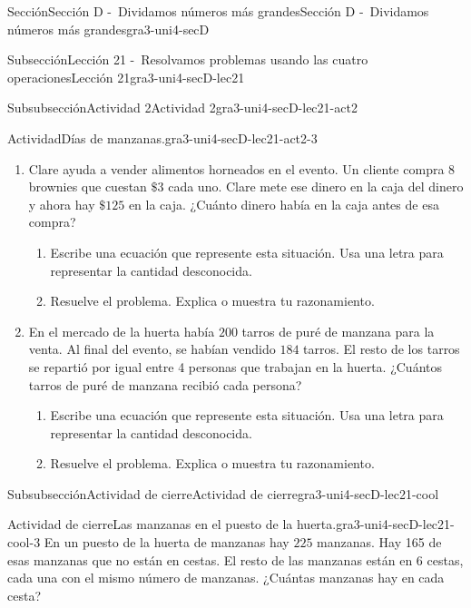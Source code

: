 \documentclass[twoside,10pt,]{article}
\begin{document}
\begin{sectionptx}{Sección}{Sección D -~Dividamos números más grandes}{}{Sección D -~Dividamos números más grandes}{}{}{gra3-uni4-secD}
\begin{subsectionptx}{Subsección}{Lección 21 -~Resolvamos problemas usando las cuatro operaciones}{}{Lección 21}{}{}{gra3-uni4-secD-lec21}
\begin{subsubsectionptx}{Subsubsección}{Actividad 2}{}{Actividad 2}{}{}{gra3-uni4-secD-lec21-act2}
\begin{activity}{Actividad}{Días de manzanas.}{gra3-uni4-secD-lec21-act2-3}
\begin{enumerate}
\begin{enumerate}
\item{}Escribe una ecuación que represente esta situación. Usa una letra para representar la cantidad desconocida.%
\item{}Resuelve el problema. Explica o muestra tu razonamiento.%
\end{enumerate}
\item{}Clare ayuda a vender alimentos horneados en el evento. Un cliente compra \(8\) brownies que cuestan \(\$3\) cada uno. Clare mete ese dinero en la caja del dinero y ahora hay \(\$125\) en la caja. ¿Cuánto dinero había en la caja antes de esa compra?%
%
\begin{enumerate}
\item{}Escribe una ecuación que represente esta situación. Usa una letra para representar la cantidad desconocida.%
\item{}Resuelve el problema. Explica o muestra tu razonamiento.%
\end{enumerate}
\item{}En el mercado de la huerta había \(200\) tarros de puré de manzana para la venta. Al final del evento, se habían vendido \(184\) tarros. El resto de los tarros se repartió por igual entre 4 personas que trabajan en la huerta. ¿Cuántos tarros de puré de manzana recibió cada persona?%
%
\begin{enumerate}
\item{}Escribe una ecuación que represente esta situación. Usa una letra para representar la cantidad desconocida.%
\item{}Resuelve el problema. Explica o muestra tu razonamiento.%
\end{enumerate}
\end{enumerate}
\end{activity}%
\end{subsubsectionptx}
%
%
\typeout{************************************************}
\typeout{************************************************}
%
\begin{subsubsectionptx}{Subsubsección}{Actividad de cierre}{}{Actividad de cierre}{}{}{gra3-uni4-secD-lec21-cool}
\begin{project}{Actividad de cierre}{Las manzanas en el puesto de la huerta.}{gra3-uni4-secD-lec21-cool-3}%
En un puesto de la huerta de manzanas hay \(225\) manzanas. Hay 165 de esas manzanas que no están en cestas. El resto de las manzanas están en \(6\) cestas, cada una con el mismo número de manzanas. ¿Cuántas manzanas hay en cada cesta?%
%
\begin{enumerate}

\end{enumerate}
\end{project}
\end{subsubsectionptx}
\end{subsectionptx}
\end{sectionptx}
\end{document}

